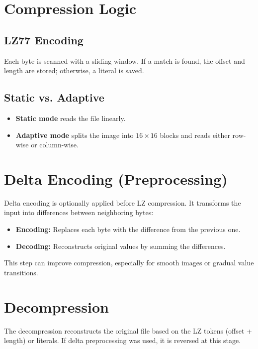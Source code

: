 \documentclass[a4paper,12pt]{article}
\begin{document}


    \section{Compression Logic}

    \subsection{LZ77 Encoding}
    Each byte is scanned with a sliding window. If a match is found, the offset and length are stored; otherwise, a literal is saved.

    \subsection{Static vs. Adaptive}
    \begin{itemize}
        \item \textbf{Static mode} reads the file linearly.
        \item \textbf{Adaptive mode} splits the image into $16 \times 16$ blocks and reads either row-wise or column-wise.
    \end{itemize}



    \section{Delta Encoding (Preprocessing)}
    Delta encoding is optionally applied before LZ compression. It transforms the input into differences between neighboring bytes:
    \begin{itemize}
        \item \textbf{Encoding:} Replaces each byte with the difference from the previous one.
        \item \textbf{Decoding:} Reconstructs original values by summing the differences.
    \end{itemize}
    This step can improve compression, especially for smooth images or gradual value transitions.



    \section{Decompression}
    The decompression reconstructs the original file based on the LZ tokens (offset + length) or literals. If delta preprocessing was used, it is reversed at this stage.
\end{document}

